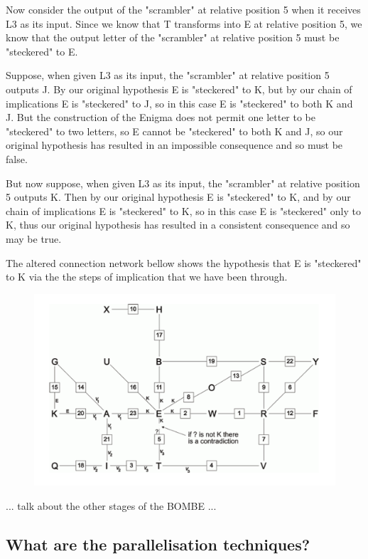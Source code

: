 \documentclass[12pt,a4paper]{article}
\begin{document}
Now consider the output of the "scrambler" at relative position 5 when it receives L3 as its input. Since we know that T transforms into E at relative position 5, we know that the output letter of the "scrambler" at relative position 5 must be "steckered" to E.

Suppose, when given L3 as its input, the "scrambler" at relative position 5 outputs J. By our original hypothesis E is "steckered" to K, but by our chain of implications E is "steckered" to J, so in this case E is "steckered" to both K and J. But the construction of the Enigma does not permit one letter to be "steckered" to two letters, so E cannot be "steckered" to both K and J, so our original hypothesis has resulted in an impossible consequence and so must be false.

But now suppose, when given L3 as its input, the "scrambler" at relative position 5 outputs K. Then by our original hypothesis E is "steckered" to K, and by our chain of implications E is "steckered" to K, so in this case E is "steckered" only to K, thus our original hypothesis has resulted in a consistent consequence and so may be true.

The altered connection network bellow shows the hypothesis that E is "steckered" to K via the the steps of implication that we have been through.

\begin{figure}[h]
\centering
\includegraphics[width=\textwidth]{StageThreeBOMBE.png}
\end{figure}

...
talk about the other stages of the BOMBE
...

\subsection{What are the parallelisation techniques?}
\end{document}
